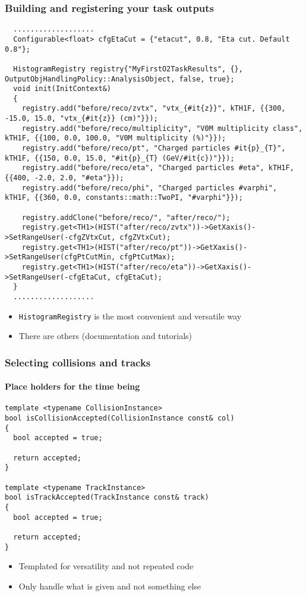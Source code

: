 \documentclass[14pt,aspectratio=169,t]{beamer}
\begin{document}
\begin{frame}[fragile]
  \frametitle{Building and registering your task outputs}
  \vspace{-0.0in}
  {\tiny \color{blue}
  \begin{verbatim}
  ...................
  Configurable<float> cfgEtaCut = {"etacut", 0.8, "Eta cut. Default 0.8"};

  HistogramRegistry registry{"MyFirstO2TaskResults", {}, OutputObjHandlingPolicy::AnalysisObject, false, true};
  void init(InitContext&)
  {
    registry.add("before/reco/zvtx", "vtx_{#it{z}}", kTH1F, {{300, -15.0, 15.0, "vtx_{#it{z}} (cm)"}});
    registry.add("before/reco/multiplicity", "V0M multiplicity class", kTH1F, {{100, 0.0, 100.0, "V0M multiplicity (%)"}});
    registry.add("before/reco/pt", "Charged particles #it{p}_{T}", kTH1F, {{150, 0.0, 15.0, "#it{p}_{T} (GeV/#it{c})"}});
    registry.add("before/reco/eta", "Charged particles #eta", kTH1F, {{400, -2.0, 2.0, "#eta"}});
    registry.add("before/reco/phi", "Charged particles #varphi", kTH1F, {{360, 0.0, constants::math::TwoPI, "#varphi"}});

    registry.addClone("before/reco/", "after/reco/");
    registry.get<TH1>(HIST("after/reco/zvtx"))->GetXaxis()->SetRangeUser(-cfgZVtxCut, cfgZVtxCut);
    registry.get<TH1>(HIST("after/reco/pt"))->GetXaxis()->SetRangeUser(cfgPtCutMin, cfgPtCutMax);
    registry.get<TH1>(HIST("after/reco/eta"))->GetXaxis()->SetRangeUser(-cfgEtaCut, cfgEtaCut);
  }
  ...................
  \end{verbatim}}
  \vspace{-0.3in}
  \begin{itemize}
    \small
    \item \verb|HistogramRegistry| is the most convenient and versatile way
    \item There are others (documentation and tutorials)
  \end{itemize}
\end{frame}



\begin{frame}[fragile]
  \frametitle{Selecting collisions and tracks}
  \framesubtitle{Place holders for the time being}
  {\scriptsize\color{blue}
  \begin{verbatim}
template <typename CollisionInstance>
bool isCollisionAccepted(CollisionInstance const& col)
{
  bool accepted = true;

  return accepted;
}

template <typename TrackInstance>
bool isTrackAccepted(TrackInstance const& track)
{
  bool accepted = true;

  return accepted;
}

  \end{verbatim}}
  \vspace{-0.5in}
  \begin{itemize}
    \small
    \item Templated for versatility and not repeated code
    \item Only handle what is given and not something else
  \end{itemize}
\end{frame}
\end{document}

